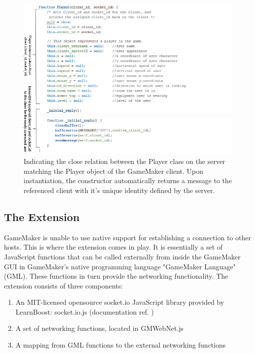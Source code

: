 \documentclass[bsc, 12pt, twoside, singlespacing, parskip, abbrevs, notimes, normalheadings, logo, deptreport]{styles/infthesis}
\begin{document}
\begin{figure}
	\includegraphics[scale=0.75]{images/server_player_construct.jpg}
	\caption{Indicating the close relation between the Player class on the server matching the Player object of the GameMaker client. Upon instantiation, the constructor automatically returns a message to the referenced client with it's unique identity defined by the server.}
	\label{fig:server_player_construct}
	\vspace{1em}
\end{figure}

\subsection{The Extension}
GameMaker is unable to use native support for establishing a connection to other hosts. This is where the extension comes in play.
It is essentially a set of JavaScript functions that can be called externally from inside the GameMaker GUI in GameMaker's native programming language "GameMaker Language" (GML). These functions in turn provide the networking functionality.
The extension consists of three components:
\begin{enumerate}
\item An MIT-licensed opensource socket.io JavaScript library provided by LearnBoost: socket.io.js (documentation ref. \cite{socketiojs})
\item A set of networking functions, located in GMWebNet.js
\item A mapping from GML functions to the external networking functions
\end{enumerate}
\end{document}
